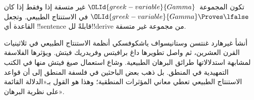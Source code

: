 \documentclass[../../../include/open-logic-section]{subfiles}
\begin{document}
تكون المجموعة~${\OLId{greek-variable}{Gamma}}$ غير متسقة إذا وفقط إذا كان
${\OLId{greek-variable}{Gamma}} \Proves \lfalse$ في الاستنتاج الطبيعي. وتجعل القاعدة
\FalseInt{} أي !!{sentence} قابلةً لل!!{derive} من مجموعة غير
متسقة.

أنشأ غيرهارد غنتسن وستانيسواف ياشكوفسكي أنظمة الاستنتاج الطبيعي في ثلاثينيات القرن العشرين، ثم واصل تطويرها داغ برافيتس وفريدريك فيتش.
ويؤثرها الفلاسفة لمشابهة استدلالاتها طرائق البرهان الطبيعية. وشاع استعمال صيغ فيتش منها في الكتب التمهيدية في المنطق.
بل ذهب بعض الباحثين في فلسفة المنطق إلى أن قواعد الاستنتاج الطبيعي تعطي معاني المؤثرات المنطقية؛ وهذا هو القول بـ«الدلالة القائمة على نظرية البرهان».
\end{document}

